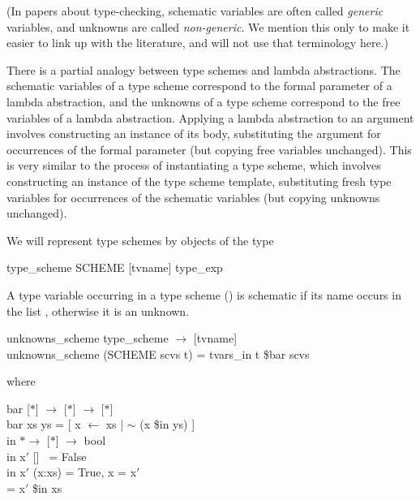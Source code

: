 (In papers about type-checking, schematic variables are often called \textit{generic}
variables, and unknowns are called \textit{non-generic}. We mention this only to
make it easier to link up with the literature, and will not use that terminology
here.)

There is a partial analogy between type schemes and lambda abstractions.
The schematic variables of a type scheme correspond to the formal parameter
of a lambda abstraction, and the unknowns of a type scheme correspond to
the free variables of a lambda abstraction. Applying a lambda abstraction to
an argument involves constructing an instance of its body, substituting the
argument for occurrences of the formal parameter (but copying free variables
unchanged). This is very similar to the process of instantiating a type scheme,
which involves constructing an instance of the type scheme template,
substituting fresh type variables for occurrences of the schematic variables
(but copying unknowns unchanged).

We will represent type schemes by objects of the type
\begin{mlcoded}
    type\_scheme \typedecl{} SCHEME [tvname] type\_exp
\end{mlcoded}
A type variable occurring in a type scheme () is schematic if
its name occurs in the list , otherwise it is an unknown.

\begin{mlcoded}
    unknowns\_scheme \hastype{} type\_scheme $\rightarrow$ [tvname]\\
    unknowns\_scheme (SCHEME scvs t) = tvars\_in t \$bar scvs
\end{mlcoded}
where
\begin{mlcoded}
    bar \hastype{} [$\ast$] $\rightarrow$ [$\ast$] $\rightarrow$ [$\ast$]\\
    bar xs ys = [ x $\leftarrow$ xs | $\sim$ (x \$in ys) ]\\
    in \hastype{} $\ast \rightarrow$ [$\ast$] $\rightarrow$ bool\\
    in x$'$ [\;] \quad \  = False\\
    in x$'$ (x:xs)  = True, \qquad x = x$'$\\
    \phantom{XXXXXXX\;\,\ }= x$'$ \$in xs
\end{mlcoded}


